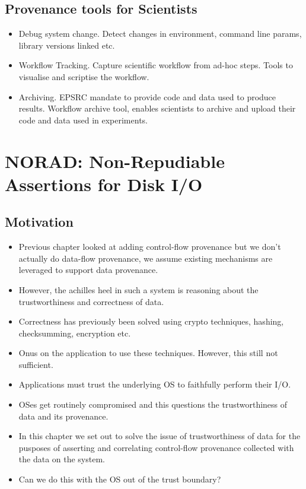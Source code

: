 \documentclass[withindex,glossary]{cam-thesis}
\begin{document}
\section{Provenance tools for Scientists}
\begin{itemize}
\item Debug system change. Detect changes in environment, command line params, library versions linked etc.
\item Workflow Tracking. Capture scientific workflow from ad-hoc steps. Tools to visualise and scriptise the workflow.
\item Archiving. EPSRC mandate to provide code and data used to produce results. Workflow archive tool, enables scientists to archive and upload their code and data used in experiments.
\end{itemize}


\chapter{NORAD: Non-Repudiable Assertions for Disk I/O}
\section{Motivation}
\begin{itemize}
\item Previous chapter looked at adding control-flow provenance but we don't actually do data-flow provenance, we assume existing mechanisms are leveraged to support data provenance.
\item However, the achilles heel in such a system is reasoning about the trustworthiness and correctness of data.
\item Correctness has previously been solved using crypto techniques, hashing, checksumming, encryption etc.
\item Onus on the application to use these techniques. However, this still not sufficient.
\item Applications must trust the underlying OS to faithfully perform their I/O.
\item OSes get routinely compromised and this questions the trustworthiness of data and its provenance.
\item In this chapter we set out to solve the issue of trustworthiness of data for the pusposes of asserting and correlating control-flow provenance collected with the data on the system.
\item Can we do this with the OS out of the trust boundary?
\end{itemize}
\end{document}

